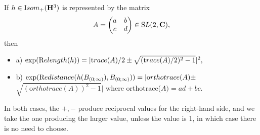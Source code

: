 \begin{lemma}\label{GMT 1.25} If $h \in {\textrm Isom}_+({\mathbf H}^3)$ is represented by the matrix $$A = \left(\begin{matrix}a &  b \cr c & d\cr\end{matrix}\right)\in {\mathrm SL}(2,{\mathbf
C}),$$ then 
\begin{itemize}
\item{a)} $\exp({\textrm Relength} (h))= |{\textrm trace}(A)/2 \pm \sqrt{({\textrm trace}(A)/2)^2 - 1}|^2,$

\item{b)} $\exp({\textrm Redistance} (h(B_{(0;\infty)}), B_{(0;\infty)}))=|{\textrm orthotrace}(A) \pm$\hfill \noindent $\sqrt{({\mathrm
orthotrace}(A))^2 - 1}|$  where 
{\textrm orthotrace(}$A) = ad + bc.$ $\phantom{\sum^\int}$
\end{itemize}
In both cases{\textrm ,} the $+, -$ produce reciprocal values for the right\/{\textrm -}\/hand side{\textrm ,}
  and we take the one producing the larger value{\textrm ,} unless the value is $1${\textrm ,} in
which case there is no need to choose.
\end{lemma}

